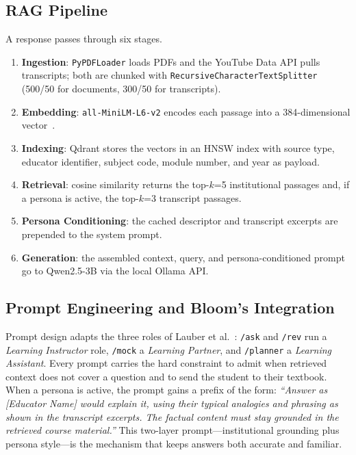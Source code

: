 \documentclass[conference]{IEEEtran}
\begin{document}
\subsection{RAG Pipeline}
A response passes through six stages.
\begin{enumerate}
    \item \textbf{Ingestion}: \texttt{PyPDFLoader} loads PDFs and the
          YouTube Data API pulls transcripts; both are chunked with
          \texttt{RecursiveCharacterTextSplitter}
          (500/50 for documents, 300/50 for transcripts).
    \item \textbf{Embedding}: \texttt{all-MiniLM-L6-v2} encodes each
          passage into a 384-dimensional vector~\cite{teixeira2025}.
    \item \textbf{Indexing}: Qdrant stores the vectors in an HNSW index
          with source type, educator identifier, subject code, module
          number, and year as payload.
    \item \textbf{Retrieval}: cosine similarity returns the top-$k$=5
          institutional passages and, if a persona is active, the
          top-$k$=3 transcript passages.
    \item \textbf{Persona Conditioning}: the cached descriptor and
          transcript excerpts are prepended to the system prompt.
    \item \textbf{Generation}: the assembled context, query, and
          persona-conditioned prompt go to Qwen2.5-3B via the local
          Ollama API.
\end{enumerate}
\subsection{Prompt Engineering and Bloom's Integration}
Prompt design adapts the three roles of Lauber et al.~\cite{lauber2025}:
\texttt{/ask} and \texttt{/rev} run a \textit{Learning Instructor} role,
\texttt{/mock} a \textit{Learning Partner}, and \texttt{/planner} a
\textit{Learning Assistant}. Every prompt carries the hard constraint
to admit when retrieved context does not cover a question and to send
the student to their textbook. When a persona is active, the prompt
gains a prefix of the form: \textit{``Answer as [Educator Name] would
explain it, using their typical analogies and phrasing as shown in the
transcript excerpts. The factual content must stay grounded in the
retrieved course material.''} This two-layer prompt---institutional
grounding plus persona style---is the mechanism that keeps answers both
accurate and familiar.
\end{document}
